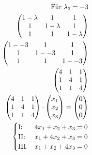 \begin{align*}
    \text{Für } \lambda_3 = -3 \\
    \begin{pmatrix}
        1 - \lambda & 1 & 1 \\
        1 & 1 - \lambda & 1 \\
        1 & 1 & 1 - \lambda    
    \end{pmatrix} \\
    \begin{pmatrix}
        1 - -3 & 1 & 1 \\
        1 & 1 - -3 & 1 \\
        1 & 1 & 1 - -3    
    \end{pmatrix} \\
    \begin{pmatrix}
        4 & 1 & 1 \\
        1 & 4 & 1 \\
        1 & 1 & 4    
    \end{pmatrix} \\
    \begin{pmatrix}
        4 & 1 & 1 \\
        1 & 4 & 1 \\
        1 & 1 & 4    
    \end{pmatrix} \cdot \begin{pmatrix}
        x_1 \\ x_2 \\ x_3
    \end{pmatrix} = \begin{pmatrix}
        0 \\ 0 \\ 0
    \end{pmatrix}\\
    \begin{cases}
        \text{I:\@} & 4x_1 + x_2 + x_3 = 0 \\
        \text{II:\@} & x_1 + 4x_2 + x_3 = 0 \\
        \text{III:\@} & x_1 + x_2 + 4x_3 = 0
    \end{cases}
\end{align*}

